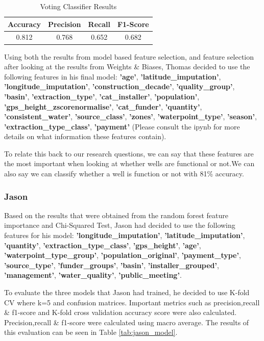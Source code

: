 \documentclass[conference]{IEEEtran}
\begin{document}
\begin{table}[H]
  \centering
  \caption{Voting Classifier Results}
  \label{tab:voting_classification_results}
  \begin{tabular}{|c|c|c|c|}
    \hline
    Accuracy & Precision & Recall & F1-Score \\
    \hline
    0.812 & 0.768 & 0.652 & 0.682 \\
    \hline
  \end{tabular}
\end{table}

Using both the results from model based feature selection, and feature selection after looking at the results from Weights \& Biases, Thomas decided to use the following features in his final model: \textbf{'age'}, \textbf{'latitude\_imputation'}, \textbf{'longitude\_imputation'}, \textbf{'construction\_decade'}, \textbf{'quality\_group'}, \textbf{'basin'}, \textbf{'extraction\_type'}, \textbf{'cat\_installer'}, \textbf{'population'}, \textbf{'gps\_height\_zscorenormalise'}, \textbf{'cat\_funder'}, \textbf{'quantity'}, \textbf{'consistent\_water'}, \textbf{'source\_class'}, \textbf{'zones'}, \textbf{'waterpoint\_type'}, \textbf{'season'}, \textbf{'extraction\_type\_class'}, \textbf{'payment'} (Please consult the ipynb for more details on what information these features contain).

To relate this back to our research questions, we can say that these features are the most important when looking at whether wells are functional or not.We can also say we can classify whether a well is function or not with 81\% accuracy.

\subsubsection{Jason}

Based on the results that were obtained from the random forest feature importance and Chi-Squared Test, Jason had decided to use the following features for his model: \textbf{'longitude\_imputation'}, \textbf{'latitude\_imputation'}, \textbf{'quantity'}, \textbf{'extraction\_type\_class'}, \textbf{'gps\_height'}, \textbf{'age'}, \textbf{'waterpoint\_type\_group'}, \textbf{'population\_original'}, \textbf{'payment\_type'}, \textbf{'source\_type'}, \textbf{'funder\_groups'}, \textbf{'basin'}, \textbf{'installer\_grouped'}, \textbf{'management'}, \textbf{'water\_quality'}, \textbf{'public\_meeting'}.

To evaluate the three models that Jason had trained, he decided to use K-fold CV where k=5 and confusion matrices. Important metrics such as precision,recall \& f1-score and K-fold cross validation accuracy score were also calculated. Precision,recall \& f1-score were calculated using macro average. The results of this evaluation can be seen in Table \ref{tab:jason_model}.
\end{document}
